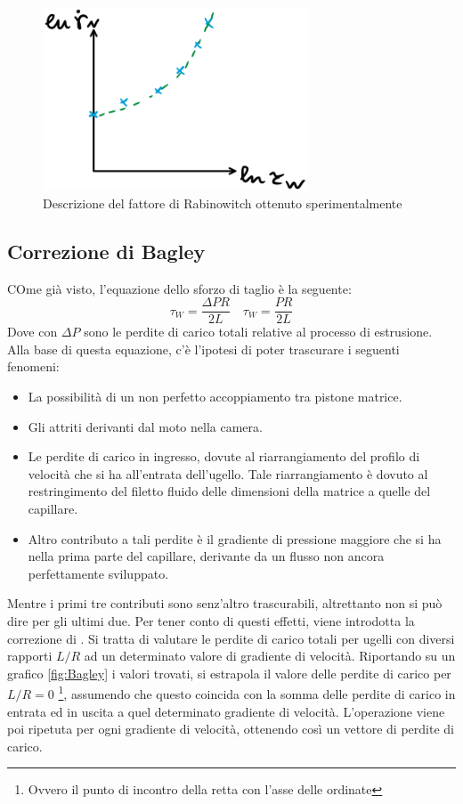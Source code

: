 \begin{figure}
\centering
\includegraphics[width = 0.7\textwidth]{gfx/CorrezioneDoppioLog}
\caption{Descrizione del fattore di Rabinowitch ottenuto sperimentalmente}
\label{fig:CorrezioneDoppioLog}
\end{figure}

\subsection{Correzione di Bagley}
COme già visto, l'equazione dello sforzo di taglio è la seguente:
\begin{equation}
\tau_W = \frac{\Delta P R}{2L} \quad \tau_W =\frac{PR}{2L}
\end{equation}
Dove con $\Delta P$ sono le perdite di carico totali relative al processo di estrusione.
Alla base di questa equazione, c'è l'ipotesi di poter trascurare i seguenti fenomeni:
\begin{itemize}
\item La possibilità di un non perfetto accoppiamento tra pistone matrice.
\item Gli attriti derivanti dal moto nella camera.
\item Le perdite di carico in ingresso, dovute al riarrangiamento del profilo di velocità che si ha all'entrata dell'ugello.
Tale riarrangiamento è dovuto al restringimento del filetto fluido delle dimensioni della matrice a quelle del capillare.
\item Altro contributo a tali perdite è il gradiente di pressione maggiore che si ha nella prima parte del capillare, derivante da un flusso non ancora perfettamente sviluppato.
\end{itemize}

Mentre i primi tre contributi sono senz'altro trascurabili, altrettanto non si può dire per gli ultimi due. Per tener conto di questi effetti, viene introdotta la correzione di .
Si tratta di valutare le perdite di carico totali per ugelli con diversi rapporti $L/R$ ad un determinato valore di gradiente di velocità.
Riportando su un grafico \ref{fig:Bagley} i valori trovati, si estrapola il valore delle perdite di carico per $L/R = 0$%
\footnote{Ovvero il punto di incontro della retta con l'asse delle ordinate},
assumendo che questo coincida con la somma delle perdite di carico in entrata ed in uscita a quel determinato gradiente di velocità.
L'operazione viene poi ripetuta per ogni gradiente di velocità, ottenendo così un vettore di perdite di carico.

